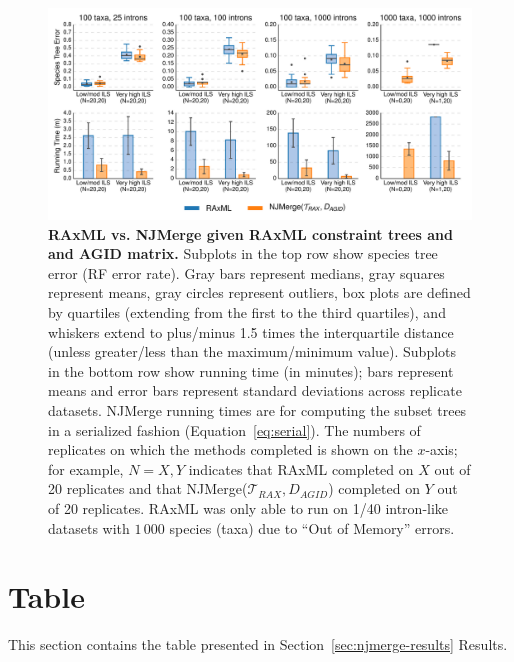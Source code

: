 \begin{figure}[!h]
\centering
\includegraphics[width=\textwidth]{figures/njmerge-fig10.pdf}
\caption{
{\bf RAxML vs. NJMerge given RAxML constraint trees and and AGID matrix. }
Subplots in the top row show species tree error (RF error rate).
Gray bars represent medians, gray squares represent means, gray circles represent outliers, box plots are defined by quartiles (extending from the first to the third quartiles), and whiskers extend to plus/minus 1.5 times the interquartile distance (unless greater/less than the maximum/minimum value).
Subplots in the bottom row show running time (in minutes); bars represent means and error bars represent standard deviations across replicate datasets.
NJMerge running times are for computing the subset trees in a serialized fashion (Equation~\ref{eq:serial}).
The numbers of replicates on which the methods completed is shown on the $x$-axis; for example, $N=X,Y$ indicates that RAxML completed on $X$ out of 20 replicates and that NJMerge($\mathcal{T}_{RAX},D_{AGID}$) completed on $Y$ out of 20 replicates.
RAxML was only able to run on 1/40 intron-like datasets with $1\,000$ species (taxa) due to ``Out of Memory'' errors.
}
\label{fig:raxml-intron}
\end{figure}

\afterpage{\clearpage}
\newpage

\section{Table}
\label{sec:njmerge-tables}
This section contains the table presented in Section~\ref{sec:njmerge-results} Results.

\vspace{12pt}

